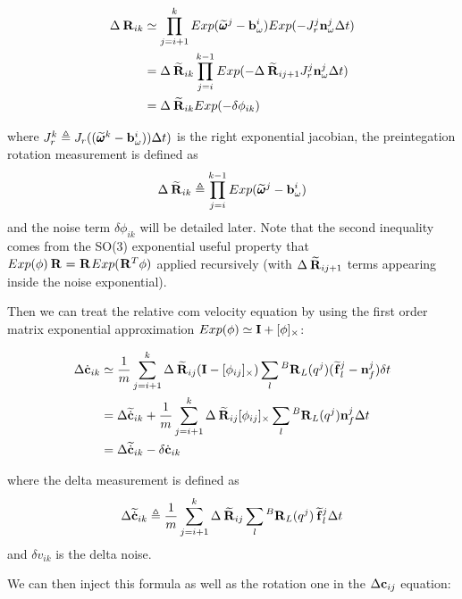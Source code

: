 \documentclass[11pt]{article}
\newcommand{\Rot}[2]{\prescript{#1}{}{\bfR}_{#2}}
\newcommand{\Rotm}[2]{\prescript{#1}{}{\widetilde{\bfR}}_{#2}}
\newcommand{\noise}{\bfn}
\newcommand{\bias}{\bfb}
\newcommand{\angvelm}[2]{\prescript{#1}{}{\widetilde{\pmb{\omega}}}_{#2}}
\newcommand{\forcem}[2]{\prescript{#1}{}{\widetilde{\bff}}_{#2}}
\newcommand{\COM}{\bfc}
\newcommand{\COMd}{\dot{\bfc}}
\newcommand{\COMdm}{\widetilde{\dot{\bfc}}}
\newcommand{\Ident}{\bfI}
\begin{document}
\begin{equation}
\begin{split}
\Delta \Rot{}{ik} &\simeq  \prod_{j=i+1}^{k} Exp(\angvelm{}{}^j - \bias_{\omega}^i) Exp(-J^j_r \noise_{\omega}^j\Delta t)
\\
&= \Delta \Rotm{}{ik}\prod_{j=i}^{k-1} Exp(- \Delta \Rotm{}{ij+1} J^j_r \noise_{\omega}^j\Delta t)
\\
&= \Delta \Rotm{}{ik}Exp(-\delta \phi_{ik})
\end{split}
\end{equation}

where $J^k_r \triangleq J_r((\angvelm{}{}^k - \bias_{\omega}^i))\Delta t)$ is the right exponential jacobian, the preintegation rotation measurement is defined as 
\begin{equation}
    \Delta \Rotm{}{ik} \triangleq \prod_{j=i}^{k-1} Exp(\angvelm{}{}^j - \bias_{\omega}^i)
\end{equation}
and the noise term $\delta \phi_{ik}$ will be detailed later. Note that the second inequality comes from the SO(3) exponential useful property that $ Exp(\phi)\Rot{}{} = \Rot{}{} Exp(\Rot{}{}^T \phi)$ applied recursively (with $\Delta \Rotm{}{ij+1}$ terms appearing inside the noise exponential).

Then we can treat the relative com velocity equation by using the first order matrix exponential approximation $Exp(\phi) \simeq \Ident + [\phi]_{\times}$:

\begin{equation}
\begin{split}
\Delta \COMd_{ik} &\simeq
\frac{1}{m} \sum_{j=i+1}^{k} \Delta \Rotm{}{ij}(\Ident - [\phi_{ij}]_{\times}) \sum_l \Rot{B}{L}(q^{j}) (\forcem{}{l}^{j} - \noise_f^{j}) \delta t 
\\
&= \Delta \COMdm_{ik} + \frac{1}{m} \sum_{j=i+1}^{k} \Delta \Rotm{}{ij}[\phi_{ij}]_{\times} \sum_l \Rot{B}{L}(q^{j})\noise_f^{j} \Delta t
\\
&= \Delta \COMdm_{ik} - \delta \COMd_{ik}
\end{split}
\end{equation}

where the delta measurement is defined as
\begin{equation}
    \Delta \COMdm_{ik} \triangleq \frac{1}{m} \sum_{j=i+1}^{k} \Delta \Rotm{}{ij} \sum_l \Rot{B}{L}(q^{j}) \forcem{}{l}^{j}\Delta t
\end{equation}
 and $\delta v_{ik}$ is the delta noise.

We can then inject this formula as well as the rotation one in the $\Delta \COM_{ij}$ equation:
\end{document}
